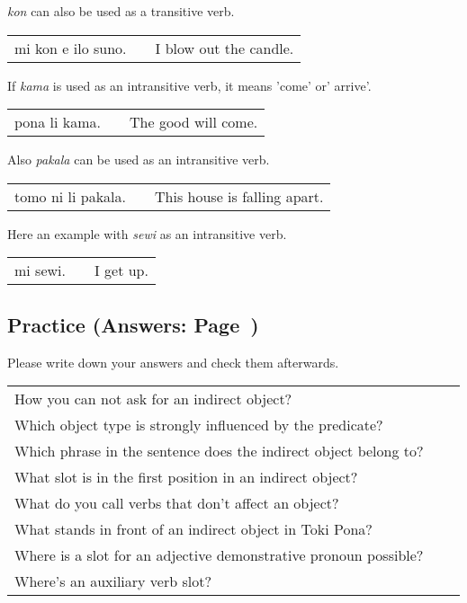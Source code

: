 \textit{kon} can also be used as a transitive verb. 

\begin{supertabular}{p{5,5cm}|ll}
mi kon e ilo suno. && I blow out the candle. \\
\end{supertabular}

%
If \textit{kama} is used as an intransitive verb, it means 'come' or' arrive'.

\begin{supertabular}{p{5,5cm}|ll}
pona li kama. && The good will come. \\
\end{supertabular}

%
Also \textit{pakala} can be used as an intransitive verb. 

\begin{supertabular}{p{5,5cm}|ll}
tomo ni li pakala. && This house is falling apart. \\	
\end{supertabular}

%
Here an example with \textit{sewi} as an intransitive verb. 

\begin{supertabular}{p{5,5cm}|ll}
mi sewi. &&  I get up. \\	
\end{supertabular}

%
\newpage
\subsection*{Practice (Answers: Page~\pageref{'indirect_objects'})}
%
Please write down your answers and check them afterwards. 

\begin{supertabular}{p{5,5cm}|ll}
How you can not ask for an indirect object? &&  \\ %
Which object type is strongly influenced by the predicate? &&   \\ %
Which phrase in the sentence does the indirect object belong to? &&  \\ %
What slot is in the first position in an indirect object? &&  \\ %
What do you call verbs that don't affect an object? &&  \\ %
What stands in front of an indirect object in Toki Pona? &&  \\ %
Where is a slot for an adjective demonstrative pronoun possible? &&  \\ %
Where's an auxiliary verb slot? &&  \\ %
\end{supertabular}

